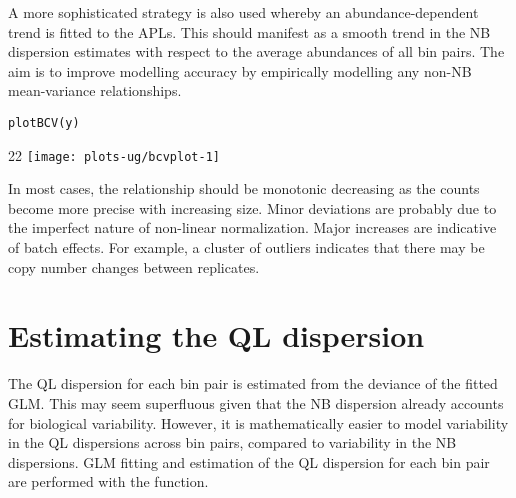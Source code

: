 \documentclass{report}\usepackage[]{graphicx}\usepackage[usenames,dvipsnames]{color}
\makeatletter
\def\maxwidth{ %
  \ifdim\Gin@nat@width>\linewidth
    \linewidth
  \else
    \Gin@nat@width
  \fi
}
\newcommand{\hlopt}[1]{\textcolor[rgb]{0,0,0}{#1}}%
\newcommand{\hlstd}[1]{\textcolor[rgb]{0.251,0.251,0.251}{#1}}%
\newcommand{\hlkwb}[1]{\textcolor[rgb]{0,0,0}{#1}}%
\newcommand{\hlkwd}[1]{\textcolor[rgb]{0.878,0.439,0.125}{#1}}%
\newenvironment{knitrout}{}{} %
\makeatother
\begin{document}
\begin{knitrout}
\color{fgcolor}
\end{knitrout}

A more sophisticated strategy is also used whereby an abundance-dependent trend is fitted to the APLs.
This should manifest as a smooth trend in the NB dispersion estimates with respect to the average abundances of all bin pairs.
The aim is to improve modelling accuracy by empirically modelling any non-NB mean-variance relationships.

\begin{knitrout}
\color{fgcolor}\begin{kframe}
\begin{alltt}
\hlkwd{plotBCV}\hlstd{(y)}
\end{alltt}
\end{kframe}\begin{adjustwidth}{2\fltoffset}{2\fltoffset}
\texttt{[image: plots-ug/bcvplot-1]} \end{adjustwidth}
\end{knitrout}

In most cases, the relationship should be monotonic decreasing as the counts become more precise with increasing size.
Minor deviations are probably due to the imperfect nature of non-linear normalization.
Major increases are indicative of batch effects.
For example, a cluster of outliers indicates that there may be copy number changes between replicates.

\section{Estimating the QL dispersion}
The QL dispersion for each bin pair is estimated from the deviance of the fitted GLM.
This may seem superfluous given that the NB dispersion already accounts for biological variability.
However, it is mathematically easier to model variability in the QL dispersions across bin pairs, compared to variability in the NB dispersions.
GLM fitting and estimation of the QL dispersion for each bin pair are performed with the  function.
\end{document}
